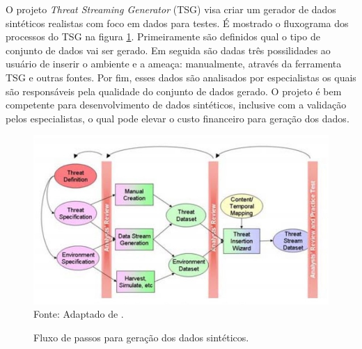 \documentclass[
	12pt,				%
	openright,			%
	oneside,			%
	a4paper,			%
	english,			%
	brazil				%
	]{abntex2}
\begin{document}
		O projeto \emph{Threat Streaming Generator} (TSG) visa criar um gerador de dados sintéticos realistas com foco em dados para testes.
		É mostrado o fluxograma dos processos do TSG na figura \ref{fig:whitingetal}.
		Primeiramente são definidos qual o tipo de conjunto de dados vai ser gerado.
		Em seguida são dadas três possilidades ao usuário de inserir o ambiente e a ameaça: manualmente, através da ferramenta TSG e outras fontes.
		Por fim, esses dados são analisados por especialistas os quais são responsáveis pela qualidade do conjunto de dados gerado.
		O projeto é bem competente para desenvolvimento de dados sintéticos, inclusive com a validação pelos especialistas, o qual pode elevar o custo financeiro para geração dos dados. \cite{whiting2008creating}
		\par
		\begin{figure}[h!]
			\centering
			\caption{Fluxo de passos para geração dos dados sintéticos.}
			\includegraphics[width=\linewidth]{./figures/TrabalhosRelacionados/whitingetal.jpg}
			\label{fig:whitingetal}
			\footnotesize Fonte: Adaptado de \cite{whiting2008creating}.
		\end{figure}
\end{document}
